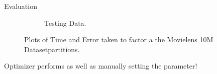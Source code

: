\documentclass[final]{beamer}
\begin{document}
{\begin{frame}{}
\begin{center}
\begin{columns}[t]
\begin{column}{0.32\textwidth}
\begin{block}{\huge Evaluation}
\begin{itemize}
{\begin{figure}
\begin{subfigure}[b]{.45\textwidth}
\begin{center}
		\caption{Testing Data. }
\end{center}
	\end{subfigure}
\hfill
	\caption{Plots of Time and Error taken to factor a the Movielens 10M Datasetpartitions.}	
\end{figure}
\item Optimizer performs as well as manually setting the parameter!}
\end{itemize}

\vspace{1cm}

    \end{block}

\vspace{1.5cm}


\end{column}
\end{columns}
\end{center}
\end{frame}}
\end{document}
